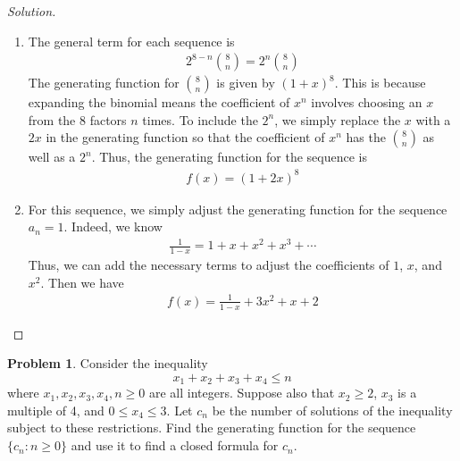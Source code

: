 \documentclass[12pt]{article}
\newcounter{chapternumber}
\theoremstyle{definition}
\newtheorem{problem-internal}{Problem}[chapternumber]
\newenvironment{problem}{
  \medskip
  \begin{problem-internal}
}{
\end{problem-internal}
}
\newenvironment{solution}{
  \begin{proof}[Solution]
    \vspace{-8px}
    \setlength{\parskip}{4px}
    \setlength{\parindent}{0px}
}{
\end{proof}
}
\begin{document}
\begin{solution}
\begin{enumerate}[label={\alph*.}]
      \item The general term for each sequence is
      \begin{align*}
        2^{8 - n}{8 \choose n} = 2^{n} {8 \choose n}
      \end{align*}
      The generating function for \(8 \choose n\) is given by \((1 + x)^8\).
      This is because expanding the binomial means the coefficient of \(x^n\) involves choosing an \(x\) from the 8 factors \(n\) times.
      To include the \(2^n\), we simply replace the \(x\) with a \(2x\) in the generating function so that the coefficient of \(x^n\) has the \({8 \choose n}\) as well as a \(2^n\).
      Thus, the generating function for the sequence is
      \begin{align*}
        f(x) = (1 + 2x)^8
      \end{align*}

      \addtocounter{enumi}{2}

      \item For this sequence, we simply adjust the generating function for the sequence \(a_n = 1\). Indeed, we know
      \begin{align*}
        \frac{1}{1 - x} = 1 + x + x^2 + x^3 + \cdots
      \end{align*}
      Thus, we can add the necessary terms to adjust the coefficients of \(1\), \(x\), and \(x^2\).
      Then we have
      \begin{align*}
        f(x) = \frac{1}{1 - x} + 3x^2 + x + 2
      \end{align*}
    \end{enumerate}
  \end{solution}


  \setcounter{problem-internal}{6}
  \begin{problem}
    Consider the inequality
    \begin{equation*}
      x_{1} + x_{2} + x_{3} + x_{4} \leq n
    \end{equation*}
    where \(x_{1}, x_{2}, x_{3}, x_{4}, n \geq 0\) are all integers.
    Suppose also that \(x_{2} \geq 2\), \(x_{3}\) is a multiple of 4, and \(0 \leq x_{4} \leq 3\).
    Let \(c_{n}\) be the number of solutions of the inequality subject to these restrictions.
    Find the generating function for the sequence \(\{c_{n}: n \geq 0\}\) and use it to find a closed formula for \(c_{n}\).
  \end{problem}
\end{document}
